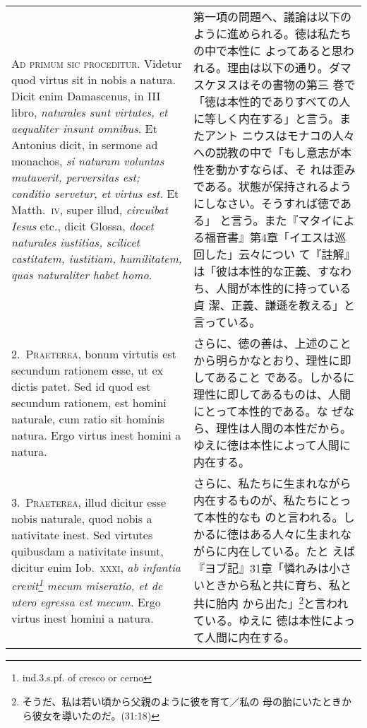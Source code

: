 \documentclass[10pt]{jsarticle}
\begin{document}
\begin{longtable}{p{21em}p{21em}}

{\scshape Ad primum sic proceditur}. Videtur quod virtus sit in nobis
a natura. Dicit enim Damascenus, in III libro, {\itshape naturales
sunt virtutes, et aequaliter insunt omnibus}. Et Antonius dicit, in
sermone ad monachos, {\itshape si naturam voluntas mutaverit,
perversitas est; conditio servetur, et virtus est}. Et
Matth.~{\scshape iv}, super illud, {\itshape circuibat Iesus} etc.,
dicit Glossa, {\itshape docet naturales iustitias, scilicet
castitatem, iustitiam, humilitatem, quas naturaliter habet homo}.

&

 第一項の問題へ、議論は以下のように進められる。徳は私たちの中で本性に
 よってあると思われる。理由は以下の通り。ダマスケヌスはその書物の第三
 巻で「徳は本性的でありすべての人に等しく内在する」と言う。またアント
 ニウスはモナコの人々への説教の中で「もし意志が本性を動かすならば、そ
 れは歪みである。状態が保持されるようにしなさい。そうすれば徳である」
 と言う。また『マタイによる福音書』第4章「イエスは巡回した」云々につい
 て『註解』は「彼は本性的な正義、すなわち、人間が本性的に持っている貞
 潔、正義、謙遜を教える」と言っている。

 
\\


2.~{\scshape Praeterea}, bonum virtutis est secundum rationem esse, ut
ex dictis patet. Sed id quod est secundum rationem, est homini
naturale, cum ratio sit hominis natura. Ergo virtus inest homini a
natura.

&

 さらに、徳の善は、上述のことから明らかなとおり、理性に即してあること
 である。しかるに理性に即してあるものは、人間にとって本性的である。な
 ぜなら、理性は人間の本性だから。ゆえに徳は本性によって人間に内在する。

 
\\



3.~{\scshape Praeterea}, illud dicitur esse nobis naturale, quod nobis
a nativitate inest. Sed virtutes quibusdam a nativitate insunt,
dicitur enim Iob.~{\scshape xxxi}, {\itshape ab infantia
crevit\footnote{ind.3.s.pf. of cresco or cerno} mecum miseratio, et de
utero egressa est mecum}. Ergo virtus inest homini a natura.


&

 さらに、私たちに生まれながら内在するものが、私たちにとって本性的なも
 のと言われる。しかるに徳はある人々に生まれながらに内在している。たと
 えば『ヨブ記』31章「憐れみは小さいときから私と共に育ち、私と共に胎内
 から出た」\footnote{そうだ、私は若い頃から父親のように彼を育て／私の
 母の胎にいたときから彼女を導いたのだ。(31:18)}と言われている。ゆえに
 徳は本性によって人間に内在する。
 

\end{longtable}
\end{document}
